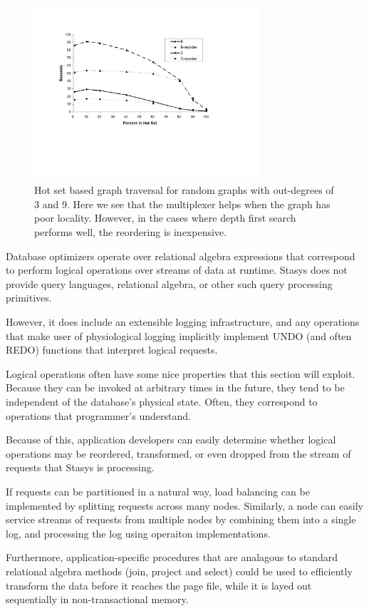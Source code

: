 \documentclass[letterpaper,twocolumn,10pt]{article}
\newcommand{\yad}{Stasys\xspace}
\begin{document}
\begin{figure}[t]
\includegraphics[width=3.3in]{figs/trans-closure-hotset.pdf}
\vspace{-12pt}
\caption{\sf\label{fig:hotGraph} Hot set based graph traversal for random graphs with out-degrees of 3 and 9.  Here
we see that the multiplexer helps when the graph has poor locality.
However, in the cases where depth first search performs well, the
reordering is inexpensive.}
\end{figure}

Database optimizers operate over relational algebra expressions that
correspond to perform logical operations over streams of data at runtime.  \yad
does not provide query languages, relational algebra, or other such query processing primitives.  

However, it does include an extensible logging infrastructure, and any
operations that make user of physiological logging implicitly
implement UNDO (and often REDO) functions that interpret logical
requests.

Logical operations often have some nice properties that this section
will exploit.  Because they can be invoked at arbitrary times in the
future, they tend to be independent of the database's physical state.
Often, they correspond to operations that programmer's understand.

Because of this, application developers can easily determine whether
logical operations may be reordered, transformed, or even
dropped from the stream of requests that \yad is processing.

If requests can be partitioned in a natural way, load
balancing can be implemented by splitting requests across many nodes.
Similarly, a node can easily service streams of requests from multiple
nodes by combining them into a single log, and processing the log
using operaiton implementations.  

Furthermore, application-specific
procedures that are analagous to standard relational algebra methods
(join, project and select) could be used to efficiently transform the data
before it reaches the page file, while it is layed out sequentially
in non-transactional memory.
\end{document}
